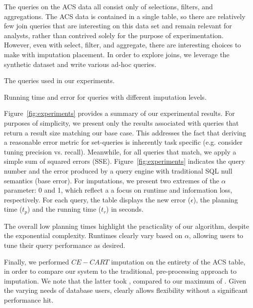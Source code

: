 The queries on the ACS data all consist only of selections, filters, and aggregations.
The ACS data is contained in a single table, so there are relatively few join queries that are interesting on this data set and remain relevant for analysts, rather
than contrived solely for the purpose of experimentation.
However, even with select, filter, and aggregate, there are interesting choices to make with imputation placement. In order to explore joins, we leverage the synthetic
dataset and write various ad-hoc queries.

\begin{table}
  \centerfloat
  
  \caption{The queries used in our experiments.}
  \label{fig:queries}
\end{table}

\begin{table}
  \centerfloat
  
  \caption{Running time and error for queries with different imputation levels.}
  \label{fig:experiments}
\end{table}

Figure~\ref{fig:experiments} provides a summary of our experimental results. For purposes of simplicity, we present only the results associated with
queries that return a result size matching our base case. This addresses the fact that deriving a reasonable error metric for set-queries 
is inherently task specific (e.g. consider tuning precision vs. recall). Meanwhile, for all queries that match, we apply a simple sum of squared errors
(SSE). Figure~\ref{fig:experiments} indicates the query number and the error produced by a query engine with traditional SQL null semantics (base error).
For imputations, we present two extremes of the $\alpha$ parameter: 0 and 1, which reflect a a focus on runtime and information loss, respectively.
For each query, the table displays the new error ($\epsilon$), the planning time ($t_p$) and the running time ($t_r$) in seconds.

The overall low planning times highlight the practicality of our algorithm, despite the exponential complexity. Runtimes clearly vary based on $\alpha$, allowing
users to tune their query performance as desired.


Finally, we performed $CE-CART$ imputation on the entirety of the ACS table, in order to compare our system to the traditional, pre-processing approach to imputation.
We note that the latter took , compared to our maximum of . Given the varying needs of database users, \ProjectName{} clearly allows flexibility without
a significant performance hit.


